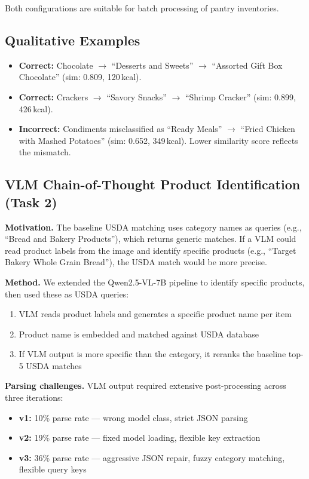 \documentclass[11pt]{article}
\begin{document}
Both configurations are suitable for batch processing of pantry inventories.

\subsection{Qualitative Examples}

\begin{itemize}[nosep,leftmargin=1.5em]
  \item \textbf{Correct:} Chocolate $\rightarrow$ ``Desserts and Sweets'' $\rightarrow$ ``Assorted Gift Box Chocolate'' (sim: 0.809, 120\,kcal).
  \item \textbf{Correct:} Crackers $\rightarrow$ ``Savory Snacks'' $\rightarrow$ ``Shrimp Cracker'' (sim: 0.899, 426\,kcal).
  \item \textbf{Incorrect:} Condiments misclassified as ``Ready Meals'' $\rightarrow$ ``Fried Chicken with Mashed Potatoes'' (sim: 0.652, 349\,kcal). Lower similarity score reflects the mismatch.
\end{itemize}

\subsection{VLM Chain-of-Thought Product Identification (Task 2)}

\textbf{Motivation.} The baseline USDA matching uses category names as queries (e.g., ``Bread and Bakery Products''), which returns generic matches. If a VLM could read product labels from the image and identify specific products (e.g., ``Target Bakery Whole Grain Bread''), the USDA match would be more precise.

\textbf{Method.} We extended the Qwen2.5-VL-7B pipeline to identify specific products, then used these as USDA queries:
\begin{enumerate}[nosep,leftmargin=1.5em]
  \item VLM reads product labels and generates a specific product name per item
  \item Product name is embedded and matched against USDA database
  \item If VLM output is more specific than the category, it reranks the baseline top-5 USDA matches
\end{enumerate}

\textbf{Parsing challenges.} VLM output required extensive post-processing across three iterations:
\begin{itemize}[nosep,leftmargin=1.5em]
  \item \textbf{v1:} 10\% parse rate --- wrong model class, strict JSON parsing
  \item \textbf{v2:} 19\% parse rate --- fixed model loading, flexible key extraction
  \item \textbf{v3:} 36\% parse rate --- aggressive JSON repair, fuzzy category matching, flexible query keys
\end{itemize}
\end{document}
